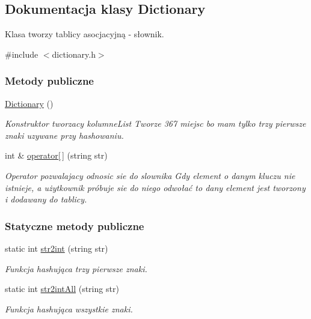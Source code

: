 \hypertarget{class_dictionary}{\subsection{Dokumentacja klasy Dictionary}
\label{class_dictionary}
}


Klasa tworzy tablicy asocjacyjną -\/ słownik.  




{\ttfamily \#include $<$dictionary.\-h$>$}

\subsubsection*{Metody publiczne}
\begin{DoxyCompactItemize}
\item 
\hyperlink{class_dictionary_aee8d612bc9d323c38faba045ba384b8b}{Dictionary} ()
\begin{DoxyCompactList}\small\item\em Konstruktor tworzacy kolumne\-List Tworze 367 miejsc bo mam tylko trzy pierwsze znaki uzywane przy hashowaniu. \end{DoxyCompactList}\item 
int \& \hyperlink{class_dictionary_a5a82ede9a412aa8a9b7bee9b2a423427}{operator\mbox{[}$\,$\mbox{]}} (string str)
\begin{DoxyCompactList}\small\item\em Operator pozwalajacy odnosic sie do slownika Gdy element o danym kluczu nie istnieje, a użytkownik próbuje sie do niego odwołać to dany element jest tworzony i dodawany do tablicy. \end{DoxyCompactList}\end{DoxyCompactItemize}
\subsubsection*{Statyczne metody publiczne}
\begin{DoxyCompactItemize}
\item 
static int \hyperlink{class_dictionary_a53981ac20e3ab2b7544d6f6f3111cdf4}{str2int} (string str)
\begin{DoxyCompactList}\small\item\em Funkcja hashująca trzy pierwsze znaki. \end{DoxyCompactList}\item 
static int \hyperlink{class_dictionary_a7dd06f1225844c860a73d98b8a814da7}{str2int\-All} (string str)
\begin{DoxyCompactList}\small\item\em Funkcja hashująca wszystkie znaki. \end{DoxyCompactList}\end{DoxyCompactItemize}
